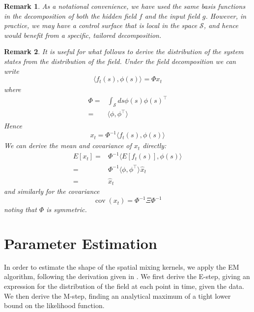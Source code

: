 \documentclass{IEEEtran}
\newcommand{\inner}[3]{\langle#1,#2\rangle_{#3}}
\DeclareMathOperator{\cov}{cov}
\newtheorem{remark}{Remark}
\begin{document}
\begin{remark}
As a notational convenience, we have used the same basis functions in the decomposition of both the hidden field $f$ and the input field $g$. However, in practice, we may have a control surface that is local in the space $\mathcal{S}$, and hence would benefit from a specific, tailored decomposition. 
\end{remark}

\begin{remark}
	It is useful for what follows to derive the distribution of the system states from the distribution of the field. Under the field decomposition we can write
	\begin{equation}
		\inner{f_t(s)}{\phi(s)}{} = \Phi x_t
	\end{equation}
where
	\begin{equation}
		\begin{split}
			\Phi = & \int_\mathcal{S}ds\phi(s)\phi(s)^\top \\
	 		= & \inner{\phi}{\phi^\top}{}
		\end{split}
	\end{equation}
Hence 
\begin{equation}
	x_t = \Phi^{-1}\inner{f_t(s)}{\phi(s)}{}
\end{equation}
We can derive the mean and covariance of $x_t$ directly:
\begin{equation}
	\begin{split}
	E[x_t] = & \Phi^{-1} \inner{E[f_t(s)]}{\phi(s)}{} \\
	= & \Phi^{-1} \inner{\phi}{\phi^\top}{} \hat{x}_t \\
	= & \hat{x}_t
	\end{split}
\end{equation}
and similarly for the covariance\cite{Scerri09}
\begin{equation}
	\label{eqn:covx}
	\cov(x_t) = \Phi^{-1} \Xi \Phi^{-1}
\end{equation}
noting that $\Phi$ is symmetric.	
\end{remark}

\section{Parameter Estimation}
\label{sec:estimation}

In order to estimate the shape of the spatial mixing kernels, we apply the EM algorithm, following the derivation given in \cite{GibsonNinness}. We first derive the E-step, giving an expression for the distribution of the field at each point in time, given the data. We then derive the M-step, finding an analytical maximum of a tight lower bound on the likelihood function.
\end{document}
